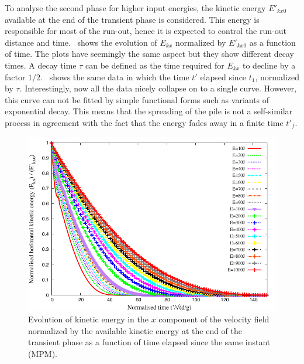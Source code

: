 To analyse the second phase for higher input energies, the 
kinetic energy $E'_{kx0}$ available at the end of the transient phase is 
considered. This energy is responsible for most of the run-out, hence it is 
expected to 
control the run-out distance and time.~ 
shows the evolution of $E_{kx}$ normalized by $E'_{kx0}$ as a function of time. 
The plots have seemingly the same aspect but they show different decay times. A 
decay time $\tau$ can be defined as the time required for $E_{kx}$ to decline 
by a factor $1/2$.~ shows the same data in 
which the time $t'$ elapsed since $t_1$, normalized by $\tau$. Interestingly, 
now all the data nicely collapse on to a single curve. However, this curve can 
not be fitted by simple functional forms such as variants of exponential decay. 
This means that the spreading of the pile is not a self-similar process in 
agreement with the fact that the energy fades away in a finite time $t'_f$. 

\begin{figure}[tbhp]
\centering
\includegraphics[width=\textwidth]{Normalised_KExExop_Slope}
\caption[Evolution of the normalised horizontal kinetic energy as function of 
time since the transient phase]{Evolution of kinetic energy in the $x$ 
component of the velocity field normalized by the available kinetic energy at 
the
end of the transient phase as a function of time elapsed since the
same instant (MPM).}
\label{fig:Normalised_KExExop_Slope}
\end{figure}

